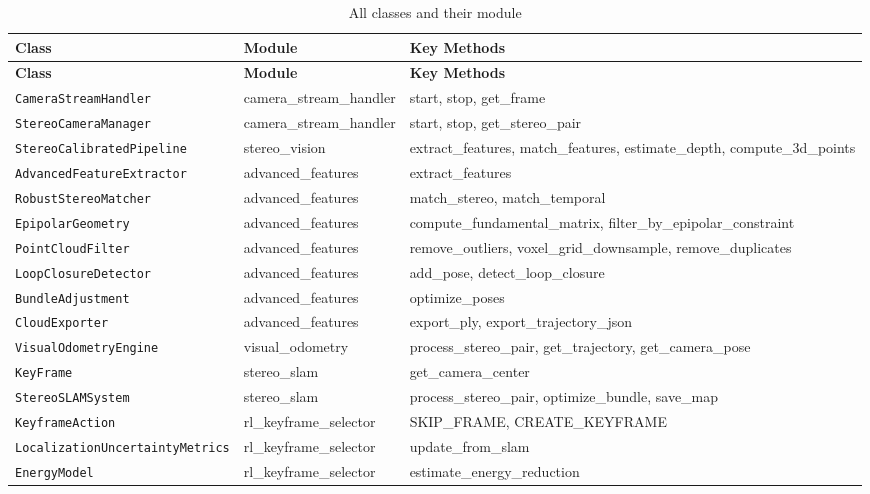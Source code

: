 \documentclass[12pt,a4paper,twoside]{report}
\theoremstyle{definition}
\newcommand{\code}[1]{\texttt{#1}}
\begin{document}
\begin{longtable}{|p{5cm}|p{3cm}|p{5.5cm}|}
\caption{All classes and their module}\label{tab:classes}\\
\hline
\textbf{Class} & \textbf{Module} & \textbf{Key Methods} \\ \hline
\endfirsthead
\hline
\textbf{Class} & \textbf{Module} & \textbf{Key Methods} \\ \hline
\endhead
\code{CameraStreamHandler} & camera\_stream\_handler & start, stop, get\_frame \\ \hline
\code{StereoCameraManager} & camera\_stream\_handler & start, stop, get\_stereo\_pair \\ \hline
\code{StereoCalibratedPipeline} & stereo\_vision & extract\_features, match\_features, estimate\_depth, compute\_3d\_points \\ \hline
\code{AdvancedFeatureExtractor} & advanced\_features & extract\_features \\ \hline
\code{RobustStereoMatcher} & advanced\_features & match\_stereo, match\_temporal \\ \hline
\code{EpipolarGeometry} & advanced\_features & compute\_fundamental\_matrix, filter\_by\_epipolar\_constraint \\ \hline
\code{PointCloudFilter} & advanced\_features & remove\_outliers, voxel\_grid\_downsample, remove\_duplicates \\ \hline
\code{LoopClosureDetector} & advanced\_features & add\_pose, detect\_loop\_closure \\ \hline
\code{BundleAdjustment} & advanced\_features & optimize\_poses \\ \hline
\code{CloudExporter} & advanced\_features & export\_ply, export\_trajectory\_json \\ \hline
\code{VisualOdometryEngine} & visual\_odometry & process\_stereo\_pair, get\_trajectory, get\_camera\_pose \\ \hline
\code{KeyFrame} & stereo\_slam & get\_camera\_center \\ \hline
\code{StereoSLAMSystem} & stereo\_slam & process\_stereo\_pair, optimize\_bundle, save\_map \\ \hline
\code{KeyframeAction} & rl\_keyframe\_selector & SKIP\_FRAME, CREATE\_KEYFRAME \\ \hline
\code{LocalizationUncertaintyMetrics} & rl\_keyframe\_selector & update\_from\_slam \\ \hline
\code{EnergyModel} & rl\_keyframe\_selector & estimate\_energy\_reduction \\ \hline

\end{longtable}
\end{document}
